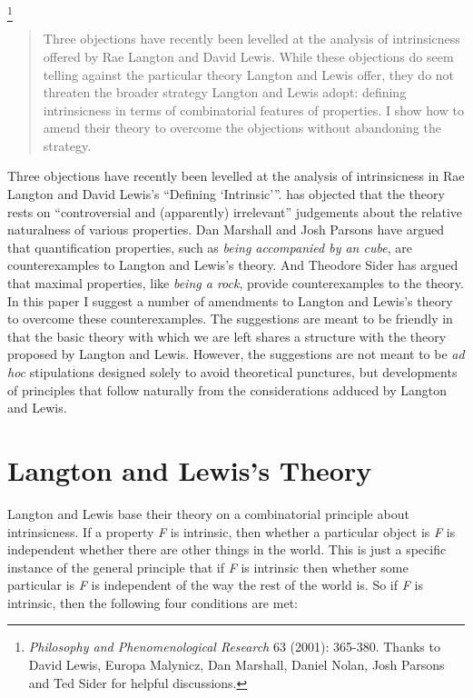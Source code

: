 \footnote{\textit{Philosophy and Phenomenological Research} 63 (2001): 365-380. Thanks to David Lewis, Europa Malynicz, Dan Marshall, Daniel Nolan, Josh Parsons and Ted Sider for helpful discussions.}

\begin{quote}
Three objections have recently been levelled at the analysis of intrinsicness offered by Rae Langton and David Lewis. While these objections do seem telling against the particular theory Langton and Lewis offer, they do not threaten the broader strategy Langton and Lewis adopt: defining intrinsicness in terms of combinatorial features of properties. I show how to amend their theory to overcome the objections without abandoning the strategy.
\end{quote}

\noindent Three objections have recently been levelled at the analysis of intrinsicness in Rae Langton and David Lewis's ``Defining `Intrinsic'''. \citet{Yablo1993} has objected that the theory rests on ``controversial and (apparently) irrelevant'' judgements about the relative naturalness of various properties. Dan Marshall and Josh Parsons \citet{Marshall2001} have argued that quantification properties, such as \textit{being accompanied by an cube}, are counterexamples to Langton and Lewis's theory. And Theodore Sider \citet{Sider2001} has argued that maximal properties, like \textit{being a rock}, provide counterexamples to the theory. In this paper I suggest a number of amendments to Langton and Lewis's theory to overcome these counterexamples. The suggestions are meant to be friendly in that the basic theory with which we are left shares a structure with the theory proposed by Langton and Lewis. However, the suggestions are not meant to be \textit{ad hoc} stipulations designed solely to avoid theoretical punctures, but developments of principles that follow naturally from the considerations adduced by Langton and Lewis.


\section{Langton and Lewis's Theory}
Langton and Lewis base their theory on a combinatorial principle about intrinsicness. If a property \textit{F} is intrinsic, then whether a particular object is \textit{F} is independent whether there are other things in the world. This is just a specific instance of the general principle that if \textit{F} is intrinsic then whether some particular is \textit{F} is independent of the way the rest of the world is. So if \textit{F} is intrinsic, then the following four conditions are met:

